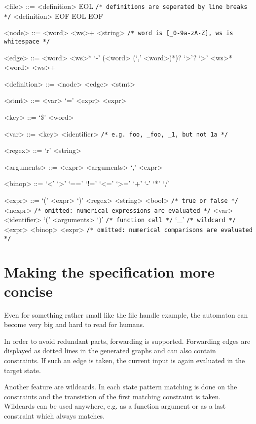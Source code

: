 \begin{grammar}

<file> ::= <definition> EOL \verb|/* definitions are seperated by line breaks */|
\alt <definition> EOF
\alt EOL
\alt EOF

<node> ::= <word> <ws>+ <string> \verb|/* word is [_0-9a-zA-Z], ws is whitespace */|

<edge> ::= <word> <ws>* `-' (<word> (`,' <word>)*)? `>'? `>' <ws>* <word> <ws>+

<definition> ::= <node>
\alt <edge> <stmt>

<stmt> ::= <var> `=' <expr>
\alt <expr>

<key> ::= `\$' <word>

<var> ::= <key>
\alt <identifier> \verb|/* e.g. foo, _foo, _1, but not 1a */|

<regex> ::= `r' <string>

<arguments> ::= <expr>
\alt <arguments> `,' <expr>

<binop> ::= `<' \alt `>' \alt `==' \alt `!=' \alt `<=' \alt `>=' \alt `+' \alt `-' \alt `*' \alt `/'

<expr> ::= `(' <expr> `)'
\alt <regex>
\alt <string>
\alt <bool> \verb|/* true or false */|
\alt <nexpr> \verb|/* omitted: numerical expressions are evaluated */|
\alt <var>
\alt <identifier> `(' <arguments> `)' \verb|/* function call */|
\alt `_' \verb|/* wildcard */|
\alt <expr> <binop> <expr> \verb|/* omitted: numerical comparisons are evaluated */|

\end{grammar}


\section{Making the specification more concise}
Even for something rather small like the file handle example, the automaton can become very big and hard to read for humans.

In order to avoid redundant parts, forwarding is supported. Forwarding edges are displayed as dotted lines in the generated graphs and can also contain constraints. If such an edge is taken, the current input is again evaluated in the target state.

Another feature are wildcards. In each state pattern matching is done on the constraints and the transistion of the first matching constraint is taken. Wildcards can be used anywhere, e.g. as a function argument or as a last constraint which always matches.

